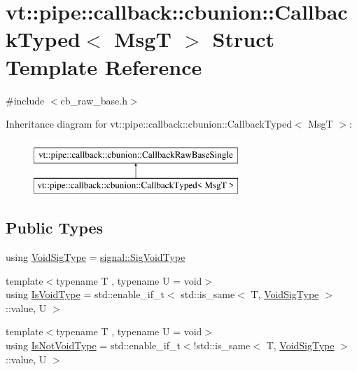 \hypertarget{structvt_1_1pipe_1_1callback_1_1cbunion_1_1_callback_typed}{}\section{vt\+:\+:pipe\+:\+:callback\+:\+:cbunion\+:\+:Callback\+Typed$<$ MsgT $>$ Struct Template Reference}
\label{structvt_1_1pipe_1_1callback_1_1cbunion_1_1_callback_typed}


{\ttfamily \#include $<$cb\+\_\+raw\+\_\+base.\+h$>$}

Inheritance diagram for vt\+:\+:pipe\+:\+:callback\+:\+:cbunion\+:\+:Callback\+Typed$<$ MsgT $>$\+:\begin{figure}[H]
\begin{center}
\leavevmode
\includegraphics[height=2.000000cm]{structvt_1_1pipe_1_1callback_1_1cbunion_1_1_callback_typed}
\end{center}
\end{figure}
\subsection*{Public Types}
\begin{DoxyCompactItemize}
\item 
using \hyperlink{structvt_1_1pipe_1_1callback_1_1cbunion_1_1_callback_typed_afeaa5f774eee46269e64e566b8239c22}{Void\+Sig\+Type} = \hyperlink{namespacevt_1_1pipe_1_1signal_acbe257d1ae44f20fa9fd9b6ed3057caf}{signal\+::\+Sig\+Void\+Type}
\item 
{\footnotesize template$<$typename T , typename U  = void$>$ }\\using \hyperlink{structvt_1_1pipe_1_1callback_1_1cbunion_1_1_callback_typed_aa23761e1f62f24201d28eed0e85322ac}{Is\+Void\+Type} = std\+::enable\+\_\+if\+\_\+t$<$ std\+::is\+\_\+same$<$ T, \hyperlink{structvt_1_1pipe_1_1callback_1_1cbunion_1_1_callback_typed_afeaa5f774eee46269e64e566b8239c22}{Void\+Sig\+Type} $>$\+::value, U $>$
\item 
{\footnotesize template$<$typename T , typename U  = void$>$ }\\using \hyperlink{structvt_1_1pipe_1_1callback_1_1cbunion_1_1_callback_typed_a57e15e61b171c50bff2e7a0dd9078f46}{Is\+Not\+Void\+Type} = std\+::enable\+\_\+if\+\_\+t$<$!std\+::is\+\_\+same$<$ T, \hyperlink{structvt_1_1pipe_1_1callback_1_1cbunion_1_1_callback_typed_afeaa5f774eee46269e64e566b8239c22}{Void\+Sig\+Type} $>$\+::value, U $>$
\end{DoxyCompactItemize}
